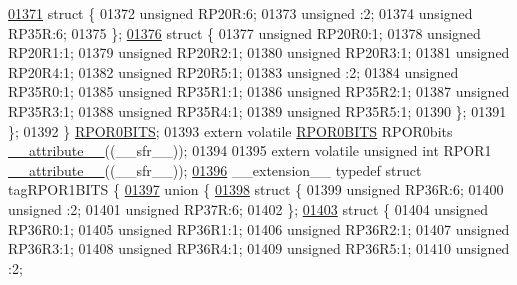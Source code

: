 \begin{DoxyCode}
\hypertarget{a00015_source_l01371}{}\hyperlink{a00015}{01371}     \textcolor{keyword}{struct }\{
01372       \textcolor{keywordtype}{unsigned} RP20R:6;
01373       \textcolor{keywordtype}{unsigned} :2;
01374       \textcolor{keywordtype}{unsigned} RP35R:6;
01375     \};
\hypertarget{a00015_source_l01376}{}\hyperlink{a00015}{01376}     \textcolor{keyword}{struct }\{
01377       \textcolor{keywordtype}{unsigned} RP20R0:1;
01378       \textcolor{keywordtype}{unsigned} RP20R1:1;
01379       \textcolor{keywordtype}{unsigned} RP20R2:1;
01380       \textcolor{keywordtype}{unsigned} RP20R3:1;
01381       \textcolor{keywordtype}{unsigned} RP20R4:1;
01382       \textcolor{keywordtype}{unsigned} RP20R5:1;
01383       \textcolor{keywordtype}{unsigned} :2;
01384       \textcolor{keywordtype}{unsigned} RP35R0:1;
01385       \textcolor{keywordtype}{unsigned} RP35R1:1;
01386       \textcolor{keywordtype}{unsigned} RP35R2:1;
01387       \textcolor{keywordtype}{unsigned} RP35R3:1;
01388       \textcolor{keywordtype}{unsigned} RP35R4:1;
01389       \textcolor{keywordtype}{unsigned} RP35R5:1;
01390     \};
01391   \};
01392 \} \hyperlink{a00014_d1/d79/a00745}{RPOR0BITS};
01393 \textcolor{keyword}{extern} \textcolor{keyword}{volatile} \hyperlink{a00014_d1/d79/a00745}{RPOR0BITS} RPOR0bits \hyperlink{a00015_a493c46f03454991ccc5aa7a6e1dfb2a7}{\_\_attribute\_\_}((\_\_sfr\_\_));
01394 
01395 \textcolor{keyword}{extern} \textcolor{keyword}{volatile} \textcolor{keywordtype}{unsigned} \textcolor{keywordtype}{int}  RPOR1 \hyperlink{a00015_a493c46f03454991ccc5aa7a6e1dfb2a7}{\_\_attribute\_\_}((\_\_sfr\_\_));
\hypertarget{a00015_source_l01396}{}\hyperlink{a00014}{01396} \_\_extension\_\_ \textcolor{keyword}{typedef} \textcolor{keyword}{struct }tagRPOR1BITS \{
\hypertarget{a00015_source_l01397}{}\hyperlink{a00015}{01397}   \textcolor{keyword}{union }\{
\hypertarget{a00015_source_l01398}{}\hyperlink{a00015}{01398}     \textcolor{keyword}{struct }\{
01399       \textcolor{keywordtype}{unsigned} RP36R:6;
01400       \textcolor{keywordtype}{unsigned} :2;
01401       \textcolor{keywordtype}{unsigned} RP37R:6;
01402     \};
\hypertarget{a00015_source_l01403}{}\hyperlink{a00015}{01403}     \textcolor{keyword}{struct }\{
01404       \textcolor{keywordtype}{unsigned} RP36R0:1;
01405       \textcolor{keywordtype}{unsigned} RP36R1:1;
01406       \textcolor{keywordtype}{unsigned} RP36R2:1;
01407       \textcolor{keywordtype}{unsigned} RP36R3:1;
01408       \textcolor{keywordtype}{unsigned} RP36R4:1;
01409       \textcolor{keywordtype}{unsigned} RP36R5:1;
01410       \textcolor{keywordtype}{unsigned} :2;

\end{DoxyCode}
